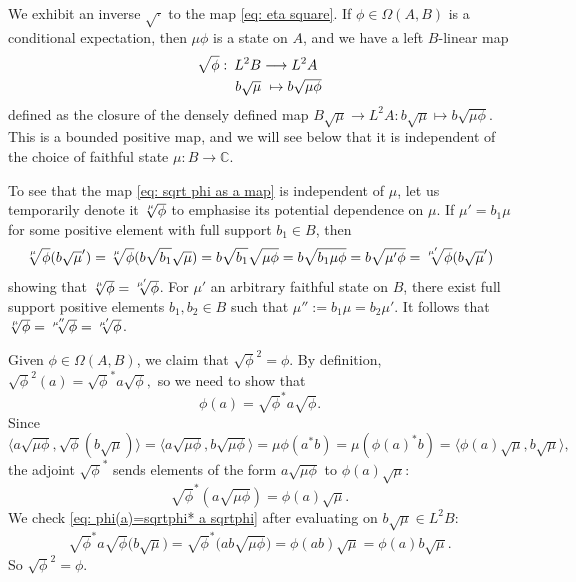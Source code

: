 \documentclass[10pt,a4paper,oneside]{amsart}
\theoremstyle{remark}
\theoremstyle{definition}
\newcommand{\homtocond}[1]{#1^2}
\begin{document}
We exhibit an inverse $\sqrt{\cdot}$ to the map \eqref{eq: eta square}. If $\phi \in \Omega(A,B)$ is a conditional expectation,
then $\mu \phi$ is a state on $A$, and we have a left $B$-linear map
    \begin{align}\label{eq: sqrt phi as a map}
	\sqrt{\phi}\,\colon\,	L^2B &\longrightarrow L^2A\\\notag
    \textstyle b\sqrt{\mu}& \textstyle \,\,\mapsto b\sqrt{\mu \phi}
    \end{align}
defined as the closure of the densely defined map
$B\sqrt \mu\to L^2A:b\sqrt{\mu} \mapsto b\sqrt{\mu \phi}$.
This is a bounded positive map, and we will see below that it is independent of the choice of faithful state $\mu:B\to \mathbb C$.

To see that the map \eqref{eq: sqrt phi as a map} is independent of $\mu$,
let us temporarily denote it $\sqrt[\uproot{2}\mu] \phi$ to emphasise its potential dependence on $\mu$.
If $\mu'=b_1\mu$ for some positive element with full support $b_1\in B$, then
\[
\sqrt[\uproot{2}\mu] \phi(b\sqrt \mu')
=\sqrt[\uproot{2}\mu] \phi(b\sqrt{b_1}\sqrt \mu)
=b\sqrt{b_1}\sqrt {\mu\phi}
=b\sqrt{b_1\mu\phi}
=b\sqrt{\mu'\phi}
=\sqrt[\uproot{2}\mu'] \phi(b\sqrt \mu')
\]
showing that $\sqrt[\uproot{2}\mu] \phi=\sqrt[\uproot{2}\mu'] \phi$.
For $\mu'$ an arbitrary faithful state on $B$, there exist full support positive elements $b_1,b_2\in B$ such that $\mu'':=b_1\mu=b_2\mu'$. It follows that $\sqrt[\uproot{2}\mu] \phi=\sqrt[\uproot{1}\mu^{\prime\!\!\;\prime}] \phi=\sqrt[\uproot{1}\mu'] \phi$.


    
Given $\phi \in \Omega(A,B)$, we claim that $\homtocond{\sqrt{\phi}}=\phi$. By definition,
	$
	\homtocond{\sqrt{\phi}}(a)= \sqrt{\phi}^* a \sqrt{\phi},
	$
    so we need to show that
    \begin{equation}\label{eq: phi(a)=sqrtphi* a sqrtphi}
    \phi(a)=\sqrt{\phi}^* a \sqrt{\phi}.
    \end{equation}
Since
	$
	\langle a \sqrt{\mu \phi},  \sqrt{\phi}(b\sqrt{\mu})\rangle=\langle a \sqrt{\mu \phi}, b \sqrt{\mu \phi}\rangle= \mu\phi(a^*b)=\mu(\phi(a)^*b) = \langle \phi(a)\sqrt{\mu}, b \sqrt{\mu} \rangle,
	$
	the adjoint $\sqrt{\phi}^*$ sends elements of the form $a\sqrt{ \mu\phi}$ to $ \phi(a)\sqrt{\mu}$:
\begin{equation}\label{eq: adj's formula}
\sqrt{\phi}^*(a\sqrt{ \mu\phi})=\phi(a)\sqrt{\mu}.
\end{equation}
We check \eqref{eq: phi(a)=sqrtphi* a sqrtphi} after evaluating on $b\sqrt \mu\in L^2B$:
	$$
    \sqrt{\phi}^* a \sqrt{\phi}\big(b\sqrt\mu\big)=\sqrt{\phi}^*\big(ab \sqrt{\mu \phi}\big)=\phi(ab) \sqrt{\mu}=\phi(a) b\sqrt{\mu}.
	$$
	So $\homtocond{\sqrt{\phi}}=\phi$.
    
\end{document}
